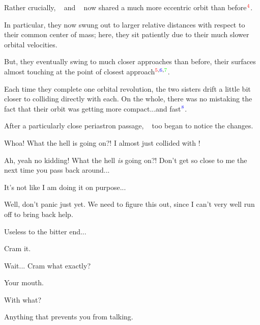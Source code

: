\documentclass[main.tex]{subfiles}
\begin{document}
\par \nar Rather crucially, \rmtaygete~ and \rmalcyone~ now shared a much more eccentric orbit than before$^{\textcolor{red}{4}}$.

\par \nar In particular, they now swung out to larger relative distances with respect to their common center of mass; here, they sit patiently due to their much slower orbital velocities. 

\par \nar But, they eventually swing to much closer approaches than before, their surfaces almost touching at the point of closest approach$^{\textcolor{red}{5},\textcolor{blue}{6},\textcolor{green}{7}}$.

\par \nar Each time they complete one orbital revolution, the two sisters drift a little bit closer to colliding directly with each.  On the whole, there was no mistaking the fact that their orbit was getting more compact...and fast$^{\textcolor{blue}{8}}$.

\par \nar After a particularly close periastron passage, \rmtaygete~ too began to notice the changes.

\par \Taygete  Whoa!  What the hell is going on?!  I almost just collided with \rmalcyone!

\par \Alcyone Ah, yeah no kidding!  What the hell \textit{is} going on?!  Don't get so close to me the next time you pass back around...

\par \Taygete It's not like I am doing it on purpose...

\par \Celaeno  Well, don't panic just yet.  We need to figure this out, since I can't very well run off to bring back help.

\par \Alcyone Useless to the bitter end...

\par \Celaeno Cram it.  

\par \Alcyone Wait... Cram what exactly?

\par \Celaeno Your mouth.  

\par \Alcyone With what?

\par \Celaeno Anything that prevents you from talking.  
\end{document}

